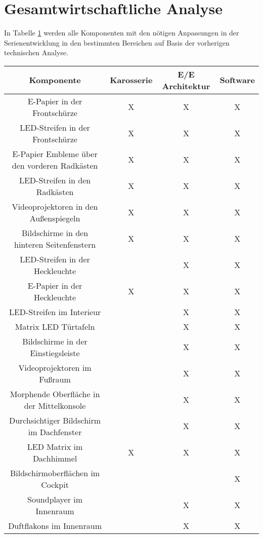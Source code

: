 \section{Gesamtwirtschaftliche Analyse}
In Tabelle \ref{tab:Entwicklung} werden alle Komponenten mit den nötigen Anpassungen in der Serienentwicklung in den bestimmten Bereichen auf Basis der vorherigen technischen Analyse. 
\begin{table}[hbt]	
	\centering
	\renewcommand{\arraystretch}{1.5}	%
	\label{tab:Entwicklung}
	\begin{tabular}{c|ccc}
		\textbf{Komponente} & \textbf{Karosserie} & \textbf{E/E Architektur} & \textbf{Software} \\ 
		\hline 
		\hline 
		E-Papier in der Frontschürze & X & X & X \\
		LED-Streifen in der Frontschürze & X & X & X \\
		E-Papier Embleme über den vorderen Radkästen & X & X & X \\
		LED-Streifen in den Radkästen & X & X & X \\
		Videoprojektoren in den Außenspiegeln & X & X & X \\
		Bildschirme in den hinteren Seitenfenstern & X & X & X \\
		LED-Streifen in der Heckleuchte &  & X & X \\
		E-Papier in der Heckleuchte & X & X & X \\
		LED-Streifen im Interieur &  & X & X \\
		Matrix LED Türtafeln &  & X & X \\
		Bildschirme in der Einstiegsleiste &  & X & X \\
		Videoprojektoren im Fußraum &  & X & X \\
		Morphende Oberfläche in der Mittelkonsole &  & X & X \\
		Durchsichtiger Bildschirm im Dachfenster &  & X & X \\
		LED Matrix im Dachhimmel & X & X & X \\
		Bildschirmoberflächen im Cockpit &  &  & X \\
		Soundplayer im Innenraum &  & X & X \\
		Duftflakons im Innenraum &  & X & X \\
	\end{tabular} 
\end{table}

